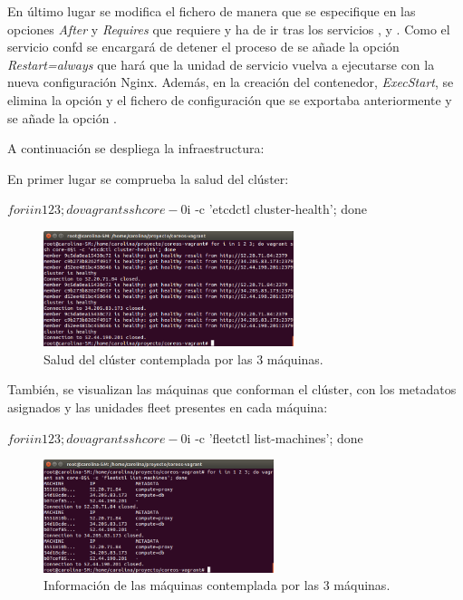 En último lugar se modifica el fichero  de manera que se especifique en las opciones \textit{After} y \textit{Requires} que requiere y ha de ir tras los servicios ,  y . Como el servicio confd se encargará de detener el proceso de  se añade la opción \textit{Restart=always} que hará que la unidad de servicio vuelva a ejecutarse con la nueva configuración Nginx. Además, en la creación del contenedor, \textit{ExecStart}, se elimina la opción  y el fichero de configuración que se exportaba anteriormente  y se añade la opción .

A continuación se despliega la infraestructura:


En primer lugar se comprueba la salud del clúster:

\begin{code}
$ for i in 1 2 3; do vagrant ssh core-0$i -c 'etcdctl cluster-health'; done
\end{code}

\begin{figure}[H]
\centering
\includegraphics[width=0.65\textwidth]{images/figures/health-confd.png}
\caption{Salud del clúster contemplada por las 3 máquinas.}
\end{figure}

También, se visualizan las máquinas que conforman el clúster, con los metadatos asignados y las unidades fleet presentes en cada máquina:

\begin{code}
$ for i in 1 2 3; do vagrant ssh core-0$i -c 'fleetctl list-machines'; done
\end{code}

\begin{figure}[H]
\centering
\includegraphics[width=0.6\textwidth]{images/figures/machines-confd.png}
\caption{Información de las máquinas contemplada por las 3 máquinas.}
\end{figure}

